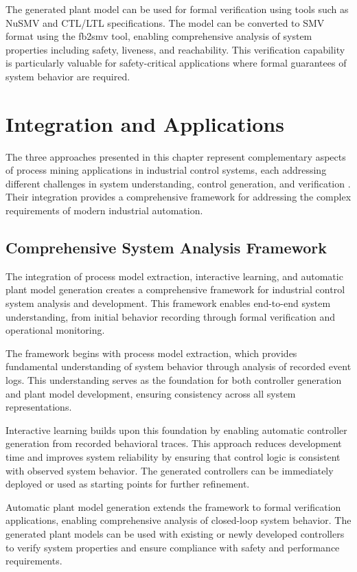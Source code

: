 The generated plant model can be used for formal verification using tools such as NuSMV and CTL/LTL specifications. The model can be converted to SMV format using the fb2smv tool, enabling comprehensive analysis of system properties including safety, liveness, and reachability. This verification capability is particularly valuable for safety-critical applications where formal guarantees of system behavior are required.

\section{Integration and Applications}

The three approaches presented in this chapter represent complementary aspects of process mining applications in industrial control systems, each addressing different challenges in system understanding, control generation, and verification \cite{sinha2019survey}. Their integration provides a comprehensive framework for addressing the complex requirements of modern industrial automation.

\subsection{Comprehensive System Analysis Framework}

The integration of process model extraction, interactive learning, and automatic plant model generation creates a comprehensive framework for industrial control system analysis and development. This framework enables end-to-end system understanding, from initial behavior recording through formal verification and operational monitoring.

The framework begins with process model extraction, which provides fundamental understanding of system behavior through analysis of recorded event logs. This understanding serves as the foundation for both controller generation and plant model development, ensuring consistency across all system representations.

Interactive learning builds upon this foundation by enabling automatic controller generation from recorded behavioral traces. This approach reduces development time and improves system reliability by ensuring that control logic is consistent with observed system behavior. The generated controllers can be immediately deployed or used as starting points for further refinement.

Automatic plant model generation extends the framework to formal verification applications, enabling comprehensive analysis of closed-loop system behavior. The generated plant models can be used with existing or newly developed controllers to verify system properties and ensure compliance with safety and performance requirements.

